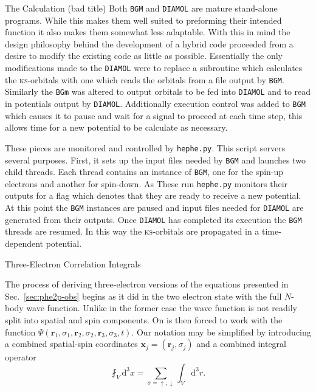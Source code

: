 \documentclass[letterpaper, 11 pt]{report}
\begin{document}
\begin{appendices}
\begin{chapter}{The Calculation (bad title) \label{chap:calcdeets}}
      Both \texttt{BGM} and \texttt{DIAMOL} are mature stand-alone programs. While this makes them well
      suited to preforming their intended function it also makes them somewhat less adaptable. With this
      in mind the design philosophy behind the development of a hybrid code proceeded from a desire to
      modify the existing code as little as possible. Essentially the only modifications made to the
      \texttt{DIAMOL} were to replace a subroutine which calculates the \textsc{ks}-orbitals with one
      which reads the orbitals from a file output by \texttt{BGM}. Similarly the \texttt{BGm} was
      altered to output orbitals to be fed into \texttt{DIAMOL} and to read in potentials output by
      \texttt{DIAMOL}. Additionally execution control was added to \texttt{BGM} which causes it to pause
      and wait for a signal to proceed at each time step, this allows time for a new potential to be
      calculate as necessary.

      These pieces are monitored and controlled by \texttt{hephe.py}. This script servers several
      purposes. First, it sets up the input files needed by \texttt{BGM} and launches two child threads.
      Each thread contains an instance of \texttt{BGM}, one for the spin-up electrons and another for
      spin-down. As These run \texttt{hephe.py} monitors their outputs for a flag which denotes that
      they are ready to receive a new potential. At this point the \texttt{BGM} instances are paused
      and input files needed for \texttt{DIAMOL} are generated from their outputs. Once \texttt{DIAMOL}
      has completed its execution the \texttt{BGM} threads are resumed. In this way the
      \textsc{ks}-orbitals are propagated in a time-dependent potential.

   \end{chapter}

   \begin{chapter}{Three-Electron Correlation Integrals \label{chap:moreIc}}

      The process of deriving three-electron versions of the equations presented in
      Sec.~\ref{sec:phe2p-obs} begins as it did in the two electron state with the full $N$-body wave
      function. Unlike in the former case the wave function is not readily split into spatial and spin
      components. On is then forced to work with the function $\Psi(\mathbf{r}_1, \sigma_1, \mathbf{r}_2,
      \sigma_2, \mathbf{r}_3, \sigma_3, t)$. Our notation may be simplified by introducing a combined
      spatial-spin coordinates $\mathbf{x}_j = (\mathbf{r}_j, \sigma_j)$ and a combined integral
      operator
      \begin{equation} \label{eq:combInt}
         \fint_V \mathrm{d}^3x = \sum\limits_{\sigma = \uparrow, \downarrow} \int_V \mathrm{d}^3 r.
      \end{equation}



\end{chapter}
\end{appendices}
\end{document}
